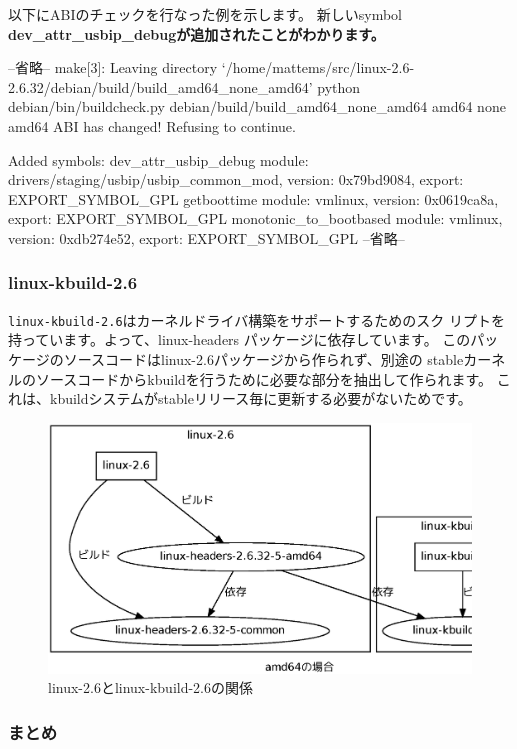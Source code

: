 \documentclass[mingoth,a4paper]{jsarticle}
\begin{document}
以下にABIのチェックを行なった例を示します。
新しいsymbol \bf{dev\_attr\_usbip\_debug}が追加されたことがわかります。
\begin{commandline}
--省略--
make[3]: Leaving directory  `/home/mattems/src/linux-2.6-2.6.32/debian/build/build_amd64_none_amd64'
python debian/bin/buildcheck.py debian/build/build_amd64_none_amd64 amd64 none amd64
ABI has changed!  Refusing to continue.

Added symbols:
dev_attr_usbip_debug    module: drivers/staging/usbip/usbip_common_mod, version: 0x79bd9084, export: EXPORT_SYMBOL_GPL 
getboottime             module: vmlinux, version: 0x0619ca8a, export: EXPORT_SYMBOL_GPL
monotonic_to_bootbased  module: vmlinux, version: 0xdb274e52, export: EXPORT_SYMBOL_GPL
--省略--
\end{commandline}

\subsubsection{linux-kbuild-2.6}
\texttt{linux-kbuild-2.6}はカーネルドライバ構築をサポートするためのスク
リプトを持っています。よって、linux-headers パッケージに依存しています。
このパッケージのソースコードはlinux-2.6パッケージから作られず、別途の
stableカーネルのソースコードからkbuildを行うために必要な部分を抽出して作られます。
これは、kbuildシステムがstableリリース毎に更新する必要がないためです。

\begin{figure}[H]
\begin{center}
\includegraphics[width=0.8\hsize]{image201005/linux-kbuild-2.6.eps}
\caption{linux-2.6とlinux-kbuild-2.6の関係}
\label{fig:linux-kbuild-2.6}
\end{center}
\end{figure}


\subsubsection{まとめ}
\end{document}
